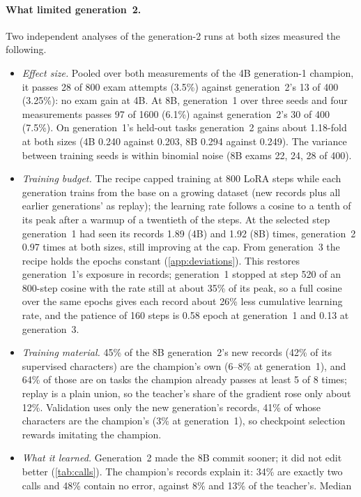 \paragraph{What limited generation~2.} Two independent analyses of the generation-2 runs at both sizes measured the
following.
\begin{itemize}
\item \emph{Effect size.} Pooled over both measurements of the 4B generation-1 champion, it passes 28 of 800 exam attempts
  (3.5\%) against generation~2's 13 of 400 (3.25\%): no exam gain at 4B. At 8B, generation~1 over three seeds and four
  measurements passes 97 of 1600 (6.1\%) against generation~2's 30 of 400 (7.5\%). On generation~1's held-out tasks
  generation~2 gains about 1.18-fold at both sizes (4B 0.240 against 0.203, 8B 0.294 against 0.249). The variance between
  training seeds is within binomial noise (8B exams 22, 24, 28 of 400).
\item \emph{Training budget.} The recipe capped training at 800 LoRA steps while each generation trains from the base on a
  growing dataset (new records plus all earlier generations' as replay); the learning rate follows a cosine to a tenth of its
  peak after a warmup of a twentieth of the steps. At the selected step generation~1 had seen its records 1.89 (4B) and 1.92
  (8B) times, generation~2 0.97 times at both sizes, still improving at the cap. From generation~3 the recipe holds the epochs
  constant (\cref{app:deviations}). This restores generation~1's exposure in records; generation~1 stopped at step 520 of an
  800-step cosine with the rate still at about 35\% of its peak, so a full cosine over the same epochs gives each record
  about 26\% less cumulative learning rate, and the patience of 160 steps is 0.58 epoch at generation~1 and 0.13 at
  generation~3.
\item \emph{Training material.} 45\% of the 8B generation~2's new records (42\% of its supervised characters) are the
  champion's own (6--8\% at generation~1), and 64\% of those are on tasks the champion already passes at least 5 of 8 times;
  replay is a plain union, so the teacher's share of the gradient rose only about 12\%. Validation uses only the new
  generation's records, 41\% of whose characters are the champion's (3\% at generation~1), so checkpoint selection rewards
  imitating the champion.
\item \emph{What it learned.} Generation~2 made the 8B commit sooner; it did not edit better (\cref{tab:calls}). The champion's
  records explain it: 34\% are exactly two calls and 48\% contain no error, against 8\% and 13\% of the teacher's. Median

\end{itemize}
